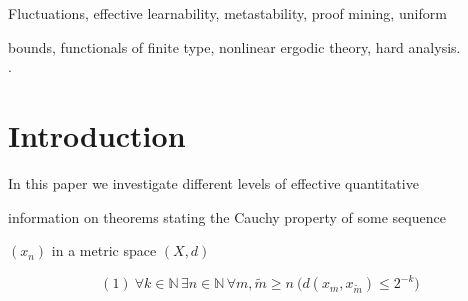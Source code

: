 \documentclass[1p]{elsarticle}
\newcommand{\NN}{\ensuremath{\mathbb{N}}}
\theoremstyle{plain}
\theoremstyle{definition}
\theoremstyle{remark}
\theoremstyle{definition}
\begin{document}
\begin{keyword}

Fluctuations, effective learnability, metastability, proof mining, uniform 

bounds, functionals of finite type, nonlinear ergodic theory, hard analysis.\\

.

\end{keyword}





\maketitle





\section{Introduction}



\newtheorem{definition}{Definition}[section]

\newtheorem{proposition}[definition]{Proposition}


\newtheorem{theorem}[definition]{Theorem}

\newtheorem{corollary}[definition]{Corollary}


\newtheorem{exercise}[definition]{Exercise}

\newtheorem{clm}[definition]{Claim}


\newtheorem{example}[definition]{Example}

\newtheorem{notation}[definition]{Notation}

\newtheorem{application}[definition]{Application} 





In this paper we investigate different levels of effective quantitative 

information on theorems stating the Cauchy property of some sequence 

$(x_n)$ in a metric space $(X,d)$

\[ (1) \ \forall k\in\NN\,\exists n\in\NN\,\forall m,\tilde{m}\ge n

\ \big( d(x_m,

x_{\tilde{m}})\le 2^{-k}\big) \] 
\end{document}
